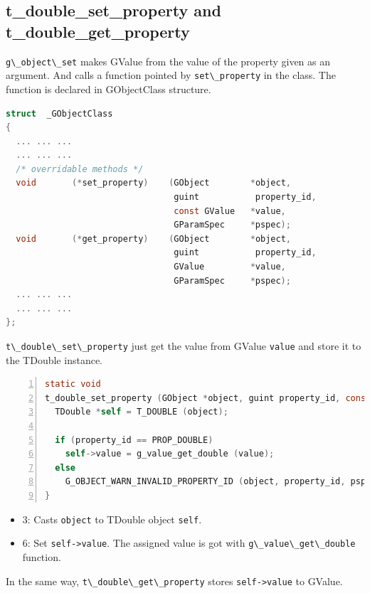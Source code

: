 \subsection{t\_double\_set\_property and
t\_double\_get\_property}\label{t_double_set_property-and-t_double_get_property}

\passthrough{\lstinline!g\_object\_set!} makes GValue from the value of
the property given as an argument. And calls a function pointed by
\passthrough{\lstinline!set\_property!} in the class. The function is
declared in GObjectClass structure.

\begin{lstlisting}[language=C]
struct  _GObjectClass
{
  ... ... ...
  ... ... ...
  /* overridable methods */
  void       (*set_property)    (GObject        *object,
                                 guint           property_id,
                                 const GValue   *value,
                                 GParamSpec     *pspec);
  void       (*get_property)    (GObject        *object,
                                 guint           property_id,
                                 GValue         *value,
                                 GParamSpec     *pspec);
  ... ... ...
  ... ... ...
};
\end{lstlisting}

\passthrough{\lstinline!t\_double\_set\_property!} just get the value
from GValue \passthrough{\lstinline!value!} and store it to the TDouble
instance.

\begin{lstlisting}[language=C, numbers=left]
static void
t_double_set_property (GObject *object, guint property_id, const GValue *value, GParamSpec *pspec) {
  TDouble *self = T_DOUBLE (object);

  if (property_id == PROP_DOUBLE)
    self->value = g_value_get_double (value);
  else
    G_OBJECT_WARN_INVALID_PROPERTY_ID (object, property_id, pspec);
}
\end{lstlisting}

\begin{itemize}
\tightlist
\item
  3: Casts \passthrough{\lstinline!object!} to TDouble object
  \passthrough{\lstinline!self!}.
\item
  6: Set \passthrough{\lstinline!self->value!}. The assigned value is
  got with \passthrough{\lstinline!g\_value\_get\_double!} function.
\end{itemize}

In the same way, \passthrough{\lstinline!t\_double\_get\_property!}
stores \passthrough{\lstinline!self->value!} to GValue.

